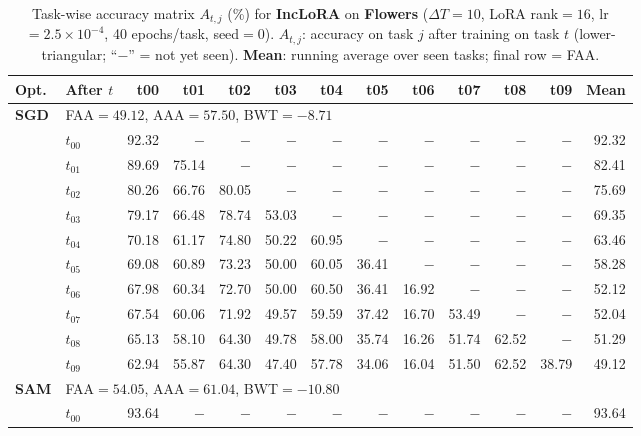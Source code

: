 \begin{table}[ht]
\centering
\caption{%
  Task-wise accuracy matrix $A_{t,j}$ (\%) for \textbf{IncLoRA} on \textbf{Flowers} ($\Delta T=10$, LoRA rank$=16$, lr$=2.5\times10^{-4}$, 40 epochs/task, seed$=0$).
  $A_{t,j}$: accuracy on task $j$ after training on task $t$  (lower-triangular; ``$-$'' = not yet seen).
  \textbf{Mean}: running average over seen tasks; final row = FAA.
}
\label{tab:raw_inclora_flowers}
\setlength{\tabcolsep}{2.8pt}
\renewcommand{\arraystretch}{0.88}
\scriptsize
\begin{tabular}{@{}l l r r r r r r r r r r r@{}}
\toprule
\textbf{Opt.} & \textbf{After $t$} & \textbf{t00} & \textbf{t01} & \textbf{t02} & \textbf{t03} & \textbf{t04} & \textbf{t05} & \textbf{t06} & \textbf{t07} & \textbf{t08} & \textbf{t09} & \textbf{Mean} \\
\midrule
\multirow{11}{*}{\textbf{SGD}} & \multicolumn{12}{l}{\quad\small FAA$=49.12$,\; AAA$=57.50$,\; BWT$=-8.71$} \\
 & $t_{00}$ & 92.32 & $-$ & $-$ & $-$ & $-$ & $-$ & $-$ & $-$ & $-$ & $-$ & 92.32 \\
 & $t_{01}$ & 89.69 & 75.14 & $-$ & $-$ & $-$ & $-$ & $-$ & $-$ & $-$ & $-$ & 82.41 \\
 & $t_{02}$ & 80.26 & 66.76 & 80.05 & $-$ & $-$ & $-$ & $-$ & $-$ & $-$ & $-$ & 75.69 \\
 & $t_{03}$ & 79.17 & 66.48 & 78.74 & 53.03 & $-$ & $-$ & $-$ & $-$ & $-$ & $-$ & 69.35 \\
 & $t_{04}$ & 70.18 & 61.17 & 74.80 & 50.22 & 60.95 & $-$ & $-$ & $-$ & $-$ & $-$ & 63.46 \\
 & $t_{05}$ & 69.08 & 60.89 & 73.23 & 50.00 & 60.05 & 36.41 & $-$ & $-$ & $-$ & $-$ & 58.28 \\
 & $t_{06}$ & 67.98 & 60.34 & 72.70 & 50.00 & 60.50 & 36.41 & 16.92 & $-$ & $-$ & $-$ & 52.12 \\
 & $t_{07}$ & 67.54 & 60.06 & 71.92 & 49.57 & 59.59 & 37.42 & 16.70 & 53.49 & $-$ & $-$ & 52.04 \\
 & $t_{08}$ & 65.13 & 58.10 & 64.30 & 49.78 & 58.00 & 35.74 & 16.26 & 51.74 & 62.52 & $-$ & 51.29 \\
 & $t_{09}$ & 62.94 & 55.87 & 64.30 & 47.40 & 57.78 & 34.06 & 16.04 & 51.50 & 62.52 & 38.79 & 49.12 \\
\midrule
\multirow{11}{*}{\textbf{SAM}} & \multicolumn{12}{l}{\quad\small FAA$=54.05$,\; AAA$=61.04$,\; BWT$=-10.80$} \\
 & $t_{00}$ & 93.64 & $-$ & $-$ & $-$ & $-$ & $-$ & $-$ & $-$ & $-$ & $-$ & 93.64 \\

\end{tabular}
\end{table}
